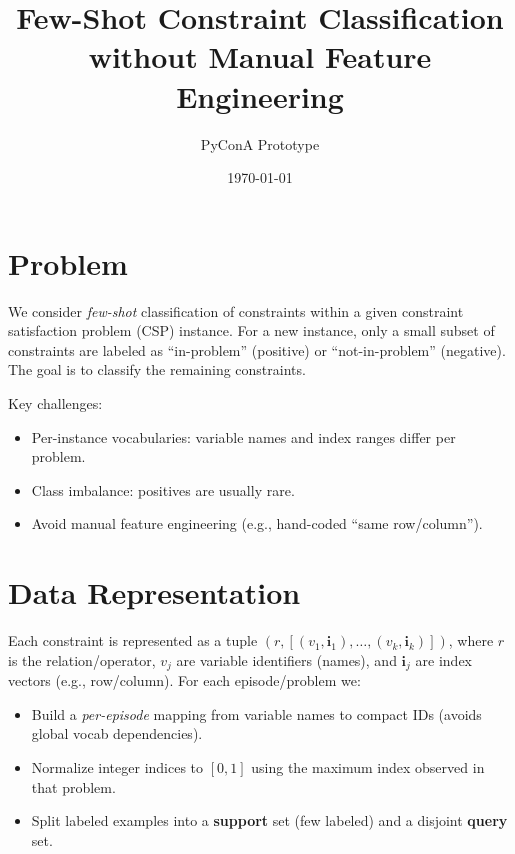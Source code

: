 \documentclass[11pt]{article}
\title{Few-Shot Constraint Classification without Manual Feature Engineering}
\author{PyConA Prototype}
\date{\today}
\begin{document}
\maketitle

\section{Problem}
We consider \emph{few-shot} classification of constraints within a given constraint satisfaction problem (CSP) instance. For a new instance, only a small subset of constraints are labeled as ``in-problem'' (positive) or ``not-in-problem'' (negative). The goal is to classify the remaining constraints.

Key challenges:
\begin{itemize}[noitemsep]
  \item Per-instance vocabularies: variable names and index ranges differ per problem.
  \item Class imbalance: positives are usually rare.
  \item Avoid manual feature engineering (e.g., hand-coded ``same row/column'').
\end{itemize}

\section{Data Representation}
Each constraint is represented as a tuple
\( (r, [(v_1, \mathbf{i}_1), \dots, (v_k, \mathbf{i}_k)]) \),
where $r$ is the relation/operator, $v_j$ are variable identifiers (names), and $\mathbf{i}_j$ are index vectors (e.g., row/column). For each episode/problem we:
\begin{itemize}[noitemsep]
  \item Build a \emph{per-episode} mapping from variable names to compact IDs (avoids global vocab dependencies).
  \item Normalize integer indices to $[0,1]$ using the maximum index observed in that problem.
  \item Split labeled examples into a \textbf{support} set (few labeled) and a disjoint \textbf{query} set.
\end{itemize}
\end{document}
